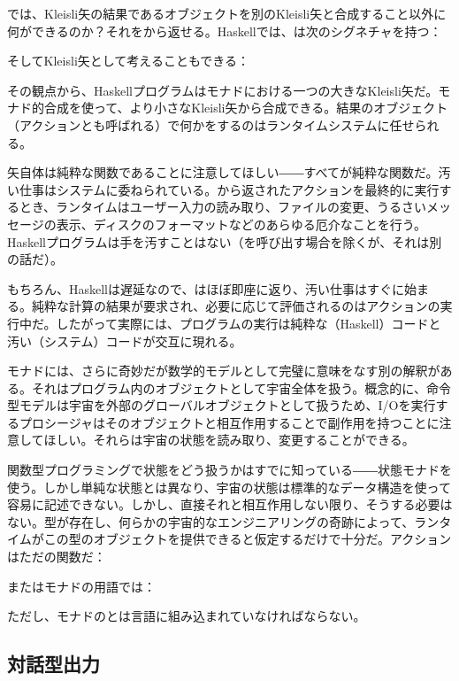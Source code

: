 では、Kleisli矢の結果であるオブジェクトを別のKleisli矢と合成すること以外に何ができるのか？それをから返せる。Haskellでは、は次のシグネチャを持つ：

そしてKleisli矢として考えることもできる：

その観点から、Haskellプログラムはモナドにおける一つの大きなKleisli矢だ。モナド的合成を使って、より小さなKleisli矢から合成できる。結果のオブジェクト（アクションとも呼ばれる）で何かをするのはランタイムシステムに任せられる。

矢自体は純粋な関数であることに注意してほしい――すべてが純粋な関数だ。汚い仕事はシステムに委ねられている。から返されたアクションを最終的に実行するとき、ランタイムはユーザー入力の読み取り、ファイルの変更、うるさいメッセージの表示、ディスクのフォーマットなどのあらゆる厄介なことを行う。Haskellプログラムは手を汚すことはない（を呼び出す場合を除くが、それは別の話だ）。

もちろん、Haskellは遅延なので、はほぼ即座に返り、汚い仕事はすぐに始まる。純粋な計算の結果が要求され、必要に応じて評価されるのはアクションの実行中だ。したがって実際には、プログラムの実行は純粋な（Haskell）コードと汚い（システム）コードが交互に現れる。

モナドには、さらに奇妙だが数学的モデルとして完璧に意味をなす別の解釈がある。それはプログラム内のオブジェクトとして宇宙全体を扱う。概念的に、命令型モデルは宇宙を外部のグローバルオブジェクトとして扱うため、I/Oを実行するプロシージャはそのオブジェクトと相互作用することで副作用を持つことに注意してほしい。それらは宇宙の状態を読み取り、変更することができる。

関数型プログラミングで状態をどう扱うかはすでに知っている――状態モナドを使う。しかし単純な状態とは異なり、宇宙の状態は標準的なデータ構造を使って容易に記述できない。しかし、直接それと相互作用しない限り、そうする必要はない。型が存在し、何らかの宇宙的なエンジニアリングの奇跡によって、ランタイムがこの型のオブジェクトを提供できると仮定するだけで十分だ。アクションはただの関数だ：

またはモナドの用語では：

ただし、モナドの\code{>=>}とは言語に組み込まれていなければならない。

\subsection{対話型出力}

